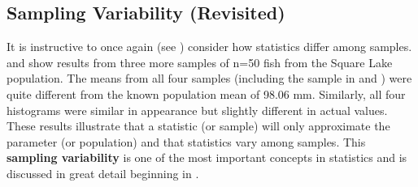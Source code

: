 \documentclass[10pt,openany]{book}\usepackage[]{graphicx}\usepackage[]{color}
\begin{document}
\vspace{-12pt}


\subsection{Sampling Variability (Revisited)}
It is instructive to once again (see ) consider how statistics differ among samples.  and  show results from three more samples of n=50 fish from the Square Lake population. The means from all four samples (including the sample in  and ) were quite different from the known population mean of 98.06 mm. Similarly, all four histograms were similar in appearance but slightly different in actual values. These results illustrate that a statistic (or sample) will only approximate the parameter (or population) and that statistics vary among samples. This \textbf{sampling variability} is one of the most important concepts in statistics and is discussed in great detail beginning in .
\end{document}
